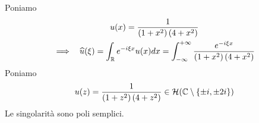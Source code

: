 Poniamo
\begin{gather*}
u( x) =\frac{1}{\left( 1+x^{2}\right)\left( 4+x^{2}\right)}\\
\implies \ \ \hat{u}( \xi ) =\int _{\RR } e^{-i\xi x} u( x) dx=\int ^{+\infty }_{-\infty }\frac{e^{-i\xi x}}{\left( 1+x^{2}\right)\left( 4+x^{2}\right)}
\end{gather*}
Poniamo
\begin{equation*}
u( z) =\frac{1}{\left( 1+z^{2}\right)\left( 4+z^{2}\right)} \in \Hc (\CC  \setminus \{\pm i,\pm 2i\})
\end{equation*}
Le singolarità sono poli semplici.


\begin{figure}[htpb]
	\centering
{} %

\begin{tikzpicture}[x=0.75pt,y=0.75pt,yscale=-1,xscale=1]


\end{tikzpicture}
\end{figure}
